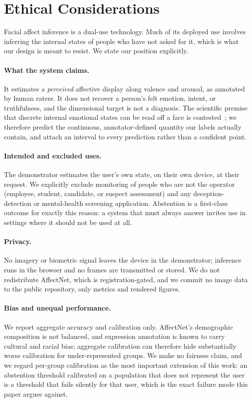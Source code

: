 \section{Ethical Considerations}
\label{sec:ethics}

Facial affect inference is a dual-use technology. Much of its deployed use
involves inferring the internal states of people who have not asked for it, which
is what our design is meant to resist. We state our position explicitly.

\paragraph{What the system claims.} It estimates a \emph{perceived} affective
display along valence and arousal, as annotated by human raters. It does not
recover a person's felt emotion, intent, or truthfulness, and the dimensional
target is not a diagnosis. The scientific premise that discrete internal
emotional states can be read off a face is contested~\cite{russell1980circumplex};
we therefore predict the continuous, annotator-defined quantity our labels
actually contain, and attach an interval to every prediction rather than a
confident point.

\paragraph{Intended and excluded uses.} The demonstrator estimates the user's own
state, on their own device, at their request. We explicitly exclude monitoring of
people who are not the operator (employee, student, candidate, or suspect
assessment) and any deception-detection or mental-health screening
application. Abstention is a first-class outcome for exactly this reason: a
system that must always answer invites use in settings where it should not be
used at all.

\paragraph{Privacy.} No imagery or biometric signal leaves the device in the
demonstrator; inference runs in the browser and no frames are transmitted or
stored. We do not redistribute AffectNet, which is registration-gated, and we
commit no image data to the public repository, only metrics and rendered
figures.

\paragraph{Bias and unequal performance.} We report aggregate accuracy and
calibration only. AffectNet's demographic composition is not balanced, and
expression annotation is known to carry cultural and racial bias; aggregate
calibration can therefore hide substantially worse calibration for
under-represented groups. We make no fairness claim, and we regard per-group
calibration as the most important extension of this work: an abstention threshold
calibrated on a population that does not represent the user is a threshold that
fails silently for that user, which is the exact failure mode this paper argues
against.
